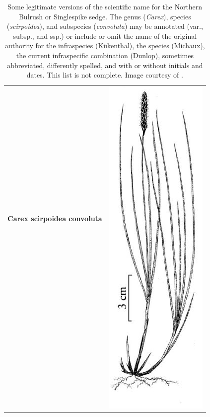\documentclass{bmcart}
\begin{document}
\begin{table}[!htb]
  \begin{center}

  \caption{Some legitimate versions of the scientific name for the Northern
    Bulrush or Singlespike sedge.  The genus (\textit{Carex}), species
    (\textit{scirpoidea}), and subspecies (\textit{convoluta}) may be annotated
    (var., subsp., and ssp.) or include or omit the name of the original authority for the
    infraspecies (Kükenthal), the species (Michaux), the current infraspecific
    combination (Dunlop), sometimes abbreviated, differently spelled, and with
    or without initials and dates. This list is not complete.  Image courtesy of \cite{FNA2002}.}\label{table:carex}

    \begin{tabular}{| l | c |}
    \hline
    \textbf{Carex scirpoidea convoluta} &
    \multirow{26}{*}{\includegraphics[scale=0.3]{images/1.png}} \\
    & \\

\end{tabular}
\end{center}
\end{table}
\end{document}
